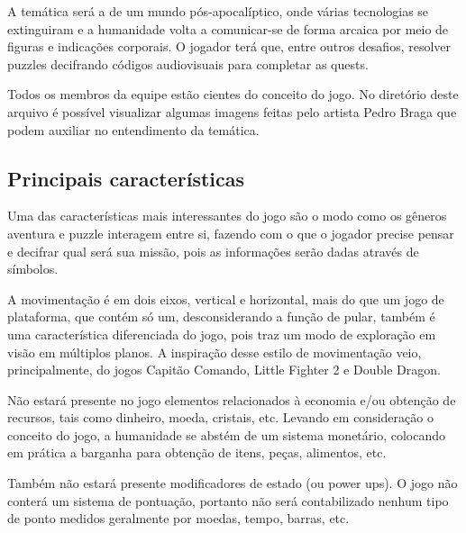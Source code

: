 \documentclass[12pt]{article}
\begin{document}
A temática será a de um mundo pós-apocalíptico, onde várias tecnologias se
extinguiram e a humanidade volta a comunicar-se de forma arcaica por meio de
figuras e indicações corporais. O jogador terá que, entre outros desafios,
resolver puzzles decifrando códigos audiovisuais para completar as quests.

Todos os membros da equipe estão cientes do conceito do jogo. No diretório
deste arquivo é possível visualizar algumas imagens feitas pelo artista Pedro
Braga que podem auxiliar no entendimento da temática.

\subsection{Principais características}
Uma das características mais interessantes do jogo são o modo como os gêneros
aventura e puzzle interagem entre si, fazendo com o que o jogador precise
pensar e decifrar qual será sua missão, pois as informações serão dadas
através de símbolos.

A movimentação é em dois eixos, vertical e horizontal, mais do que um jogo de
plataforma, que contém só um, desconsiderando a função de pular, também é uma
característica diferenciada do jogo, pois traz um modo de exploração em visão
em múltiplos planos. A inspiração desse estilo de movimentação veio,
principalmente, do jogos Capitão Comando, Little Fighter 2 e Double Dragon.

Não estará presente no jogo elementos relacionados à economia e/ou obtenção de
recursos, tais como dinheiro, moeda, cristais, etc. Levando em consideração o
conceito do jogo, a humanidade se abstém de um sistema monetário, colocando em
prática a barganha para obtenção de itens, peças, alimentos, etc.

Também não estará presente modificadores de estado (ou power ups). O jogo não
conterá um sistema de pontuação, portanto não será contabilizado nenhum tipo
de ponto medidos geralmente por moedas, tempo, barras, etc.
\end{document}
